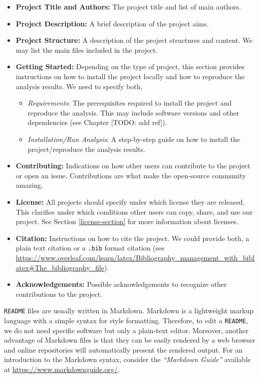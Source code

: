 \documentclass[
  11pt,
]{book}
\providecommand{\tightlist}{%
  \setlength{\itemsep}{0pt}\setlength{\parskip}{0pt}}
\begin{document}
\begin{itemize}
\tightlist
\item
  \textbf{Project Title and Authors:} The project title and list of main authors.
\item
  \textbf{Project Description:} A brief description of the project aims.
\item
  \textbf{Project Structure:} A description of the project structures and content. We may list the main files included in the project.
\item
  \textbf{Getting Started:} Depending on the type of project, this section provides instructions on how to install the project locally and how to reproduce the analysis results. We need to specify both,

  \begin{itemize}
  \tightlist
  \item
    \emph{Requirements}: The prerequisites required to install the project and reproduce the analysis. This may include software versions and other dependencies (see Chapter {[}TODO: add ref{]}).
  \item
    \emph{Installation/Run Analysis}: A step-by-step guide on how to install the project/reproduce the analysis results.
  \end{itemize}
\item
  \textbf{Contributing:} Indications on how other users can contribute to the project or open an issue. Contributions are what make the open-source community amazing.
\item
  \textbf{License:} All projects should specify under which license they are released. This clarifies under which conditions other users can copy, share, and use our project. See Section \ref{license-section} for more information about licenses.
\item
  \textbf{Citation:} Instructions on how to cite the project. We could provide both, a plain text citation or a \texttt{.bib} format citation (see \url{https://www.overleaf.com/learn/latex/Bibliography_management_with_biblatex\#The_bibliography_file}).
\item
  \textbf{Acknowledgements:} Possible acknowledgements to recognize other contributions to the project.
\end{itemize}

\texttt{README} files are usually written in Markdown. Markdown is a lightweight markup language with a simple syntax for style formatting. Therefore, to edit a \texttt{README}, we do not need specific software but only a plain-text editor. Moreover, another advantage of Markdown files is that they can be easily rendered by a web browser and online repositories will automatically present the rendered output. For an introduction to the Markdown syntax, consider the \emph{``Markdown Guide''} available at \url{https://www.markdownguide.org/}.
\end{document}
